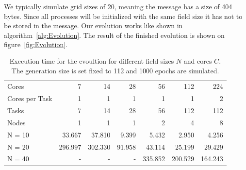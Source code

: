 \documentclass[12pt]{article}
\begin{document}
We typically simulate grid sizes of 20, meaning the message has a size of 404 bytes. Since all processes will be initialized with the same field size it has not to be stored in the message. Our evolution works like shown in algorithm~\ref{alg:Evolution}. The result of the finished evolution is shown on figure~\ref{fig:Evolution}.


\begin{table}[t]
    \centering
    \begin{tabular}{lrrrrrr}
        \toprule
        Cores & 7 & 14 & 28 & 56 & 112 & 224 \\
        Cores per Task & 1 & 1 & 1 & 1 & 1 & 2 \\
        Tasks & 7 & 14 & 28 & 56 & 112 & 112 \\
        Nodes & 1 & 1 & 1 & 2 & 4 & 8 \\
        \midrule
        N = 10 & 33.667     & 37.810 & 9.399 & 5.432 & 2.950 & 4.256 \\
        N = 20 & 296.997    & 302.330 & 91.958 & 43.114 & 25.199 & 29.429 \\
        N = 40 & -          & - & - & 335.852 & 200.529 & 164.243 \\
        \bottomrule
    \end{tabular}
    \caption{Execution time for the evoultion for different field sizes $N$ and cores $C$. The generation size is set fixed to 112 and 1000 epochs are simulated.}
    \label{tab:Speedup}
\end{table}

\clearpage
\end{document}

